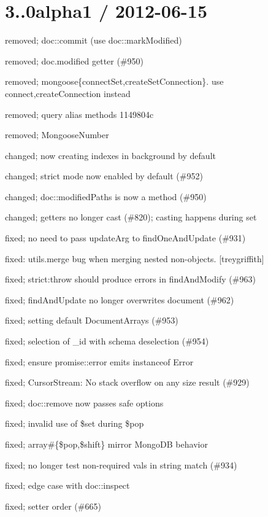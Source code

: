 \section*{3..\+0alpha1 / 2012-\/06-\/15 }


\begin{DoxyItemize}
\item removed; doc\+::commit (use doc\+::mark\+Modified)
\item removed; doc.\+modified getter (\#950)
\item removed; mongoose\{connect\+Set,create\+Set\+Connection\}. use connect,create\+Connection instead
\item removed; query alias methods 1149804c
\item removed; Mongoose\+Number
\item changed; now creating indexes in background by default
\item changed; strict mode now enabled by default (\#952)
\item changed; doc\+::modified\+Paths is now a method (\#950)
\item changed; getters no longer cast (\#820); casting happens during set
\item fixed; no need to pass update\+Arg to find\+One\+And\+Update (\#931)
\item fixed\+: utils.\+merge bug when merging nested non-\/objects. \mbox{[}treygriffith\mbox{]}
\item fixed; strict\+:throw should produce errors in find\+And\+Modify (\#963)
\item fixed; find\+And\+Update no longer overwrites document (\#962)
\item fixed; setting default Document\+Arrays (\#953)
\item fixed; selection of \+\_\+id with schema deselection (\#954)
\item fixed; ensure promise\+::error emits instanceof Error
\item fixed; Cursor\+Stream\+: No stack overflow on any size result (\#929)
\item fixed; doc\+::remove now passes safe options
\item fixed; invalid use of \$set during \$pop
\item fixed; array\#\{\$pop,\$shift\} mirror Mongo\+DB behavior
\item fixed; no longer test non-\/required vals in string match (\#934)
\item fixed; edge case with doc\+::inspect
\item fixed; setter order (\#665)

\end{DoxyItemize}
